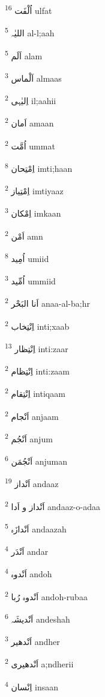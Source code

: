 \documentclass[12pt]{article}
\begin{document}
\begin{RTL}
\begin{multicols}{5}
{\ur اُلْفَت}   \textsuperscript{16} ulfat

{\ur اللیٰہ}   \textsuperscript{5} al-l;aah

{\ur اَلَم}   \textsuperscript{5} alam

{\ur اَلْماس}   \textsuperscript{3} almaas

{\ur اِلیٰہی}   \textsuperscript{2} il;aahii

{\ur اَمان}   \textsuperscript{2} amaan

{\ur اُمَّت}   \textsuperscript{2} ummat

{\ur اِمْتِحان}   \textsuperscript{8} imti;haan

{\ur اِمْتِیاز}   \textsuperscript{2} imtiyaaz

{\ur اِمْکان}   \textsuperscript{3} imkaan

{\ur اَمْن}   \textsuperscript{2} amn

{\ur اُمِید}   \textsuperscript{8} umiid

{\ur اُمِّید}   \textsuperscript{3} ummiid

{\ur اَنا البَحْر}   \textsuperscript{2} anaa-al-ba;hr

{\ur اِنْتِخاب}   \textsuperscript{2} inti;xaab

{\ur اِنْتِظار}   \textsuperscript{13} inti:zaar

{\ur اِنْتِظام}   \textsuperscript{2} inti:zaam

{\ur اِنْتِقام}   \textsuperscript{2} intiqaam

{\ur اَنْجام}   \textsuperscript{2} anjaam

{\ur اَنْجُم}   \textsuperscript{2} anjum

{\ur اَنْجُمَن}   \textsuperscript{6} anjuman

{\ur اَنْداز}   \textsuperscript{19} andaaz

{\ur اَنْداز و اَدا}   \textsuperscript{2} andaaz-o-adaa

{\ur اَنْدازَہ}   \textsuperscript{5} andaazah

{\ur اَنْدَر}   \textsuperscript{4} andar

{\ur اَنْدوہ}   \textsuperscript{4} andoh

{\ur اَنْدوہ رُبا}   \textsuperscript{2} andoh-rubaa

{\ur اَنْدیشَہ}   \textsuperscript{6} andeshah

{\ur اَنْدھیر}   \textsuperscript{3} andher

{\ur اَنْدھیری}   \textsuperscript{2} a;ndherii

{\ur اِنْسان}   \textsuperscript{4} insaan


\end{multicols}
\end{RTL}
\end{document}
